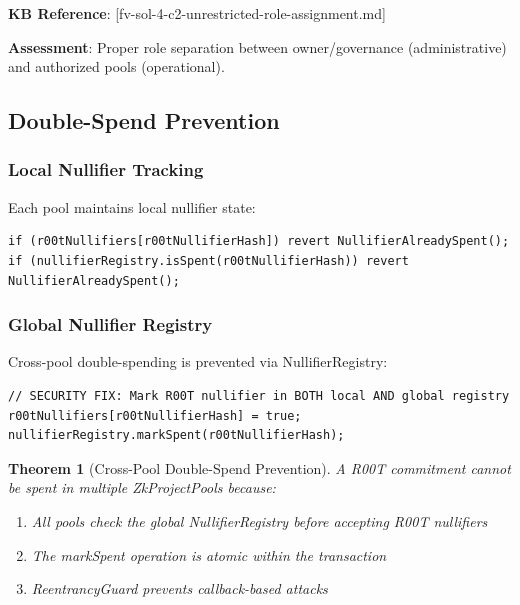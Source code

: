 \documentclass[11pt,a4paper]{article}
\newtheorem{theorem}{Theorem}[section]
\begin{document}
\textbf{KB Reference}: [fv-sol-4-c2-unrestricted-role-assignment.md]

\textbf{Assessment}: Proper role separation between owner/governance (administrative) and authorized pools (operational).

\subsection{Double-Spend Prevention}

\subsubsection{Local Nullifier Tracking}

Each pool maintains local nullifier state:

\begin{lstlisting}[style=solidity, caption={Local Nullifier Check (ZkAMMPair.sol:232-233)}]
if (r00tNullifiers[r00tNullifierHash]) revert NullifierAlreadySpent();
if (nullifierRegistry.isSpent(r00tNullifierHash)) revert NullifierAlreadySpent();
\end{lstlisting}

\subsubsection{Global Nullifier Registry}

Cross-pool double-spending is prevented via NullifierRegistry:

\begin{lstlisting}[style=solidity, caption={Global Nullifier Coordination (ZkAMMPair.sol:249-251)}]
// SECURITY FIX: Mark R00T nullifier in BOTH local AND global registry
r00tNullifiers[r00tNullifierHash] = true;
nullifierRegistry.markSpent(r00tNullifierHash);
\end{lstlisting}

\begin{theorem}[Cross-Pool Double-Spend Prevention]
A R00T commitment cannot be spent in multiple ZkProjectPools because:
\begin{enumerate}
    \item All pools check the global NullifierRegistry before accepting R00T nullifiers
    \item The markSpent operation is atomic within the transaction
    \item ReentrancyGuard prevents callback-based attacks
\end{enumerate}
\end{theorem}
\end{document}
